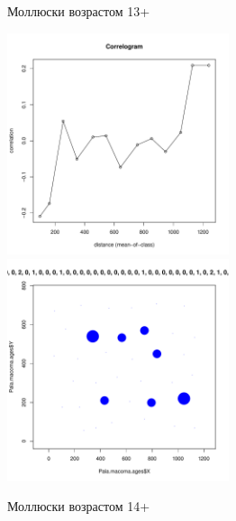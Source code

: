 \begin{figure}[h]
	\begin{minipage}[b]{\linewidth}
	\begin{center}
		Моллюски возрастом 13+
	\end{center}
	\end{minipage}

	\begin{minipage}[b]{.46\linewidth}
	\begin{center}
		\includegraphics[width=65mm]{../Barenc_Sea/distribution_Moran/Pala_macoma_age_N13_.pdf}
	\end{center}
	\end{minipage}
%
	\hfil %
%
	\begin{minipage}[b]{.46\linewidth}
	\begin{center}
		\includegraphics[width=65mm]{../Barenc_Sea/distribution_Moran/Pala_macoma_age_bubb_N13_.pdf}
	\end{center}
	\end{minipage}

	\begin{minipage}[b]{\linewidth}
	\begin{center}
		Моллюски возрастом 14+
	\end{center}
	\end{minipage}
	

\end{figure}
